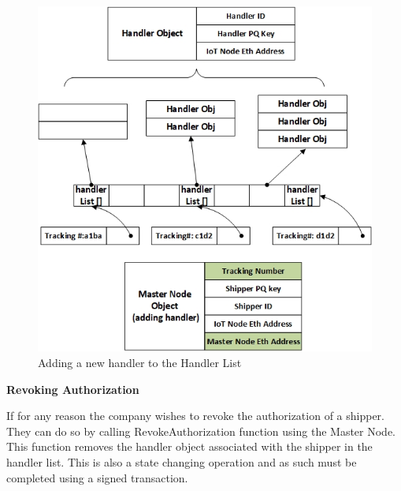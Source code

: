 \begin{figure}[h]
	\centering
    \includegraphics[width=120mm,scale=1]{figs/handler-impl}
	\caption{Adding a new handler to the Handler List}
	\label{fig:handler-impl} 
\end{figure}
\vspace{0.1cm}
\textbf{Revoking Authorization}

If for any reason the company wishes to revoke the authorization of a shipper. They can do so by calling RevokeAuthorization function using the Master Node. This function removes the handler object associated with the shipper in the handler list. This is also a state changing operation and as such must be completed using a signed transaction.

\vspace{0.5cm}
